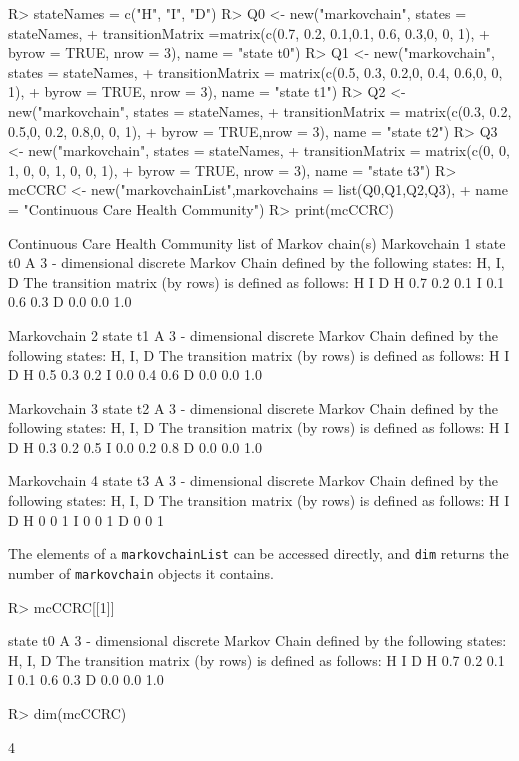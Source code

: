 \documentclass[
  nojss]{jss}
\begin{document}
\begin{CodeChunk}
\begin{CodeInput}
R> stateNames = c("H", "I", "D")
R> Q0 <- new("markovchain", states = stateNames, 
+         transitionMatrix =matrix(c(0.7, 0.2, 0.1,0.1, 0.6, 0.3,0, 0, 1), 
+         byrow = TRUE, nrow = 3), name = "state t0")
R> Q1 <- new("markovchain", states = stateNames, 
+         transitionMatrix = matrix(c(0.5, 0.3, 0.2,0, 0.4, 0.6,0, 0, 1), 
+         byrow = TRUE, nrow = 3), name = "state t1")
R> Q2 <- new("markovchain", states = stateNames, 
+         transitionMatrix = matrix(c(0.3, 0.2, 0.5,0, 0.2, 0.8,0, 0, 1), 
+         byrow = TRUE,nrow = 3), name = "state t2")
R> Q3 <- new("markovchain", states = stateNames, 
+           transitionMatrix = matrix(c(0, 0, 1, 0, 0, 1, 0, 0, 1), 
+         byrow = TRUE, nrow = 3), name = "state t3")
R> mcCCRC <- new("markovchainList",markovchains = list(Q0,Q1,Q2,Q3), 
+       name = "Continuous Care Health Community")
R> print(mcCCRC)
\end{CodeInput}
\begin{CodeOutput}
Continuous Care Health Community  list of Markov chain(s) 
Markovchain  1 
state t0 
 A  3 - dimensional discrete Markov Chain defined by the following states: 
 H, I, D 
 The transition matrix  (by rows)  is defined as follows: 
    H   I   D
H 0.7 0.2 0.1
I 0.1 0.6 0.3
D 0.0 0.0 1.0

Markovchain  2 
state t1 
 A  3 - dimensional discrete Markov Chain defined by the following states: 
 H, I, D 
 The transition matrix  (by rows)  is defined as follows: 
    H   I   D
H 0.5 0.3 0.2
I 0.0 0.4 0.6
D 0.0 0.0 1.0

Markovchain  3 
state t2 
 A  3 - dimensional discrete Markov Chain defined by the following states: 
 H, I, D 
 The transition matrix  (by rows)  is defined as follows: 
    H   I   D
H 0.3 0.2 0.5
I 0.0 0.2 0.8
D 0.0 0.0 1.0

Markovchain  4 
state t3 
 A  3 - dimensional discrete Markov Chain defined by the following states: 
 H, I, D 
 The transition matrix  (by rows)  is defined as follows: 
  H I D
H 0 0 1
I 0 0 1
D 0 0 1
\end{CodeOutput}
\end{CodeChunk}

The elements of a \texttt{markovchainList} can be accessed directly, and \texttt{dim} returns the number of \texttt{markovchain} objects it contains.

\begin{CodeChunk}
\begin{CodeInput}
R> mcCCRC[[1]]
\end{CodeInput}
\begin{CodeOutput}
state t0 
 A  3 - dimensional discrete Markov Chain defined by the following states: 
 H, I, D 
 The transition matrix  (by rows)  is defined as follows: 
    H   I   D
H 0.7 0.2 0.1
I 0.1 0.6 0.3
D 0.0 0.0 1.0
\end{CodeOutput}
\begin{CodeInput}
R> dim(mcCCRC)
\end{CodeInput}
\begin{CodeOutput}
[1] 4
\end{CodeOutput}
\end{CodeChunk}
\end{document}
